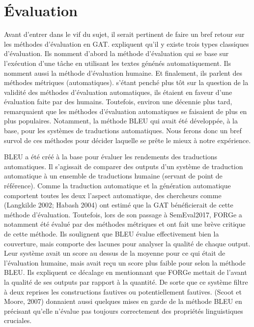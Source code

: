 \section{Évaluation}
Avant d'entrer dans le vif du sujet, il serait pertinent de faire un bref retour sur les méthodes d'évaluation en \ac{GAT}. \cite{ReiterInvestigationValidityMetrics2009} expliquent qu'il y existe trois types classiques d'évaluation. Ils nomment d'abord la méthode d'évaluation qui se base sur l'exécution d'une tâche en utilisant les textes génénés automatiquement. Ils nomment aussi la méthode d'évaluation humaine. Et finalement, ils parlent des méthodes métriques (automatiques). \cite{ReiterBuildingNaturalLanguage2000} s'étant penché plus tôt sur la question de la validité des méthodes d'évaluation automatiques, ils étaient en faveur d'une évaluation faite par des humains. Toutefois, environ une décennie plus tard, \cite{ReiterInvestigationValidityMetrics2009} remarquaient que les méthodes d'évaluation automatiques se faisaient de plus en plus populaires. Notamment, la méthode BLEU qui avait été développée, à la base, pour les systèmes de traductions automatiques. Nous ferons donc un bref survol de ces méthodes pour décider laquelle se prête le mieux à notre expérience.

BLEU a été créé à la base pour évaluer les rendements des traductions automatiques. Il s'agissait de comparer des outputs d'un système de traduction automatique à un ensemble de traductions humaine (servant de point de référence). Comme la traduction automatique et la génération automatique comportent toutes les deux l'aspect automatique, des chercheurs comme (Langkilde 2002; Habash 2004) ont estimé que la \ac{GAT} bénéficierait de cette méthode d'évaluation. Toutefois, lors de son passage à SemEval2017, FORGe a notamment été évalué par des méthodes métriques et \cite{DBLP:conf/semeval/MilleCBW17} ont fait une brève critique de cette méthode. Ils soulignent que BLEU évalue effectivement bien la couverture, mais comporte des lacunes pour analyser la qualité de chaque output. Leur système avait un score au dessus de la moyenne pour ce qui était de l'évaluation humaine, mais avait reçu un score plus faible pour selon la méthode BLEU. Ils expliquent ce décalage en mentionnant que FORGe mettait de l'avant la qualité de ses outputs par rapport à la quantité. De sorte que ce système filtre à deux reprises les constructions fautives ou potentiellement fautives. (Scoot et Moore, 2007) donnaient aussi quelques mises en garde de la méthode BLEU en précisant qu'elle n'évalue pas toujours correctement des propriétés linguistiques cruciales.

